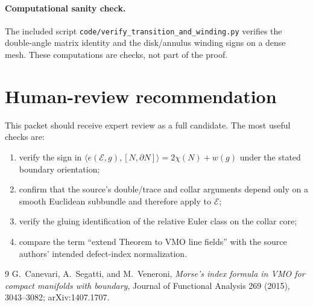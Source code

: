 \documentclass[11pt]{article}
\theoremstyle{definition}
\theoremstyle{remark}
\newcommand{\E}{\mathcal E}
\newcommand{\bd}{\partial}
\begin{document}
\paragraph{Computational sanity check.}
The included script \texttt{code/verify\_transition\_and\_winding.py} verifies
the double-angle matrix identity and the disk/annulus winding signs on a dense
mesh.  These computations are checks, not part of the proof.

\section{Human-review recommendation}

This packet should receive expert review as a full candidate.  The most useful
checks are:
\begin{enumerate}
\item verify the sign in
$\langle e(\E,g),[N,\bd N]\rangle=2\chi(N)+w(g)$ under the stated boundary
orientation;
\item confirm that the source's double/trace and collar arguments depend only
on a smooth Euclidean subbundle and therefore apply to $\E$;
\item verify the gluing identification of the relative Euler class on the
collar core;
\item compare the term ``extend Theorem to VMO line fields'' with the source
authors' intended defect-index normalization.
\end{enumerate}

\begin{thebibliography}{9}
G.~Canevari, A.~Segatti, and M.~Veneroni,
\emph{Morse's index formula in VMO for compact manifolds with boundary},
Journal of Functional Analysis 269 (2015), 3043--3082;
arXiv:1407.1707.

\end{thebibliography}
\end{document}
